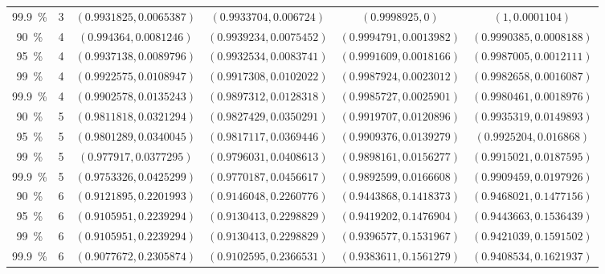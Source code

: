 \begin{sidewaystable}
\begin{tabular}{cccccc}
\SI{99.9}{\percent} & 3 & $(0.9931825, 0.0065387)$ & $(0.9933704, 0.006724)$ & $(0.9998925, 0)$ & $(1, 0.0001104)$\\
\cmidrule(lr){1-6}
\SI{90}{\percent} & 4 & $(0.994364, 0.0081246)$ & $(0.9939234, 0.0075452)$ & $(0.9994791, 0.0013982)$ & $(0.9990385, 0.0008188)$\\
\SI{95}{\percent} & 4 & $(0.9937138, 0.0089796)$ & $(0.9932534, 0.0083741)$ & $(0.9991609, 0.0018166)$ & $(0.9987005, 0.0012111)$\\
\SI{99}{\percent} & 4 & $(0.9922575, 0.0108947)$ & $(0.9917308, 0.0102022)$ & $(0.9987924, 0.0023012)$ & $(0.9982658, 0.0016087)$\\
\SI{99.9}{\percent} & 4 & $(0.9902578, 0.0135243)$ & $(0.9897312, 0.0128318)$ & $(0.9985727, 0.0025901)$ & $(0.9980461, 0.0018976)$\\
\cmidrule(lr){1-6}
\SI{90}{\percent} & 5 & $(0.9811818, 0.0321294)$ & $(0.9827429, 0.0350291)$ & $(0.9919707, 0.0120896)$ & $(0.9935319, 0.0149893)$\\
\SI{95}{\percent} & 5 & $(0.9801289, 0.0340045)$ & $(0.9817117, 0.0369446)$ & $(0.9909376, 0.0139279)$ & $(0.9925204, 0.016868)$\\
\SI{99}{\percent} & 5 & $(0.977917, 0.0377295)$ & $(0.9796031, 0.0408613)$ & $(0.9898161, 0.0156277)$ & $(0.9915021, 0.0187595)$\\
\SI{99.9}{\percent} & 5 & $(0.9753326, 0.0425299)$ & $(0.9770187, 0.0456617)$ & $(0.9892599, 0.0166608)$ & $(0.9909459, 0.0197926)$\\
\cmidrule(lr){1-6}
\SI{90}{\percent} & 6 & $(0.9121895, 0.2201993)$ & $(0.9146048, 0.2260776)$ & $(0.9443868, 0.1418373)$ & $(0.9468021, 0.1477156)$\\
\SI{95}{\percent} & 6 & $(0.9105951, 0.2239294)$ & $(0.9130413, 0.2298829)$ & $(0.9419202, 0.1476904)$ & $(0.9443663, 0.1536439)$\\
\SI{99}{\percent} & 6 & $(0.9105951, 0.2239294)$ & $(0.9130413, 0.2298829)$ & $(0.9396577, 0.1531967)$ & $(0.9421039, 0.1591502)$\\
\SI{99.9}{\percent} & 6 & $(0.9077672, 0.2305874)$ & $(0.9102595, 0.2366531)$ & $(0.9383611, 0.1561279)$ & $(0.9408534, 0.1621937)$\\
\bottomrule
    \end{tabular}
\end{sidewaystable}